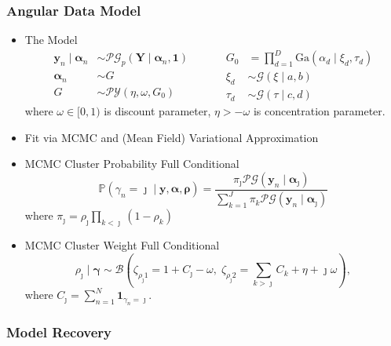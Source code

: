 \documentclass[aspectratio=169,10pt,notes]{beamer}
\begin{document}
\begin{frame}
    \frametitle{Angular Data Model}
    {\small 
    \begin{itemize}
        \item The Model
        \[
        \begin{aligned}
                \bm{y}_n \mid \bm{\alpha}_n &\sim
                    \mathcal{PG}_p\left(\bm{Y}\mid\bm{\alpha}_n,\bm{1}\right)\\
                \bm{\alpha}_n &\sim G\\
                G &\sim \mathcal{PY}\left(\eta, \omega, G_0\right)        
            \end{aligned}
            ~\hspace{1cm}
            \begin{aligned}
                G_0 &= {\textstyle\prod}_{d = 1}^{D}
                    \text{Ga}(\alpha_{d}\mid \xi_{d},\tau_{d})\\
                \xi_{d} &\sim \mathcal{G}(\xi\mid a, b)\\
                \tau_{d} &\sim \mathcal{G}(\tau\mid c, d)
            \end{aligned}
        \]
        where $\omega \in [0,1)$ is discount parameter, $\eta > -\omega$ is concentration parameter.
    \item Fit via MCMC and (Mean Field) Variational Approximation
    \item MCMC Cluster Probability Full Conditional
        \[
        \mathbb{P}\left(\gamma_n = \jmath\mid \bm{y},\bm{\alpha},\bm{\rho}\right) = 
            \frac{\pi_\jmath\mathcal{PG}(\bm{y}_n\mid\bm{\alpha}_{\jmath})}{
                \sum_{k = 1}^J \pi_k\mathcal{PG}(\bm{y}_n\mid\bm{\alpha}_{\jmath})}
        \]
        where $\pi_{\jmath} = \rho_{\jmath}\prod_{k < \jmath}(1 - \rho_k)$
        \item MCMC Cluster Weight Full Conditional
        \[
        \rho_{\jmath}\mid\bm{\gamma} \sim 
            \mathcal{B}\left(\zeta_{\rho_\jmath 1} = 1 + C_{\jmath} - \omega,\; 
            \zeta_{\rho_{\jmath} 2} = {\textstyle \sum}_{k>\jmath} 
                C_k + \eta + \jmath \omega\right),
        \]
        where $C_\jmath = \sum_{n = 1}^N\bm{1}_{\gamma_n = \jmath}$.
    \end{itemize}
    }
\end{frame} %

\subsubsection{Model Recovery}
\end{document}
